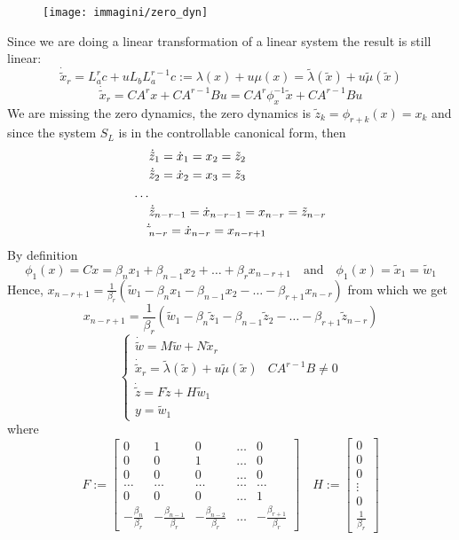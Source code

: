 \begin{figure}[H]
	\centering
	\texttt{[image: immagini/zero\_dyn]}
\end{figure}
Since we are doing a linear transformation of a linear system the result is still linear:
\[
\dot{\tilde{x}}_r=L_a^rc+uL_bL_a^{r-1}c:=\lambda(x)+u\mu(x)=\tilde{\lambda}(\tilde{x})+u\tilde{\mu}(\tilde{x})
\]
\[
\dot{\tilde{x}}_r=CA^rx+CA^{r-1}Bu=CA^r\phi^{-1}_x
\tilde{x}+CA^{r-1}Bu\]We are missing the zero dynamics, the zero dynamics is $\tilde{z}_k=\phi_{r+k}(x)=x_k$ and since the system $S_L$ is in the controllable canonical form, then \[
\begin{aligned}
	& \dot{\tilde{z}}_1=\dot{x}_1=x_2=\tilde{z}_2\\
	&\dot{\tilde{z}}_2=\dot{x}_2=x_3=\tilde{z}_3\\
	\dots\\
	&\dot{\tilde{z}}_{n-r-1}=\dot{x}_{n-r-1}=x_{n-r}=\tilde{z}_{n-r}\\
	&\dot{\tilde}_{n-r}=\dot{x}_{n-r}=x_{n-r+1}
\end{aligned}
\]
By definition
\[
\phi_1(x)=Cx=\beta_nx_1+\beta_{n-1}x_2+\dots+\beta_rx_{n-r+1} \quad \text{and} \quad \phi_1(x)=\tilde{x}_1=\tilde{w}_1 
\]
Hence, $x_{n-r+1}=\frac{1}{\beta_r}(\tilde{w}_1-\beta_nx_1-\beta_{n-1}x_2-\dots-\beta_{r+1}x_{n-r})$ from which we get 
\[
x_{n-r+1}=\frac{1}{\beta_r}(\tilde{w}_1-\beta_n\tilde{z}_1-\beta_{n-1}\tilde{z}_2-\dots-\beta_{r+1}\tilde{z}_{n-r})
\]
\begin{equation*}
	\left\{
	\begin{array}{ll}	
		\dot{\tilde{w}}=M\tilde{w}+N\tilde{x}_r\\
		\dot{\tilde{x}}_r=\tilde{\lambda}(\tilde{x})+u\tilde{\mu}(\tilde{x}) & CA^{r-1}B \neq 0\\
		\dot{\tilde{z}}=F\tilde{z}+H\tilde{w}_1\\
		y=\tilde{w}_1
	\end{array}
	\right.
\end{equation*}
where
\begin{equation*}
	F:=\begin{bmatrix}
		0 & 1 & 0 & \dots & 0 \\
		0 & 0 & 1 & \dots & 0 \\
		0 & 0 & 0 & \dots & 0 \\
		\dots & \dots & \dots & \dots & \dots \\
		0 & 0 & 0 & \dots & 1 \\
		-\frac{\beta_n}{\beta_r} & -\frac{\beta_{n-1}}{\beta_r} & -\frac{\beta_{n-2}}{\beta_r} & \dots & -\frac{\beta_{r+1}}{\beta_r}
	\end{bmatrix}\quad
H:=\begin{bmatrix}
	0 \\
	0 \\
	0 \\
	\vdots \\
	0 \\
	\frac{1}{\beta_r}
\end{bmatrix}
\end{equation*}
